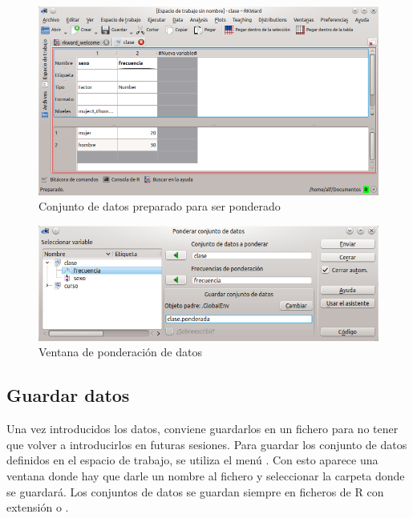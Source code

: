 \begin{figure}[htp]
\begin{center}
  \includegraphics[scale=0.6]{introduccion_r/img/datos_frecuencias}
  \caption{Conjunto de datos preparado para ser ponderado}
  \label{g:ponderar_variable1}
\end{center}
\end{figure}

\begin{figure}[htp]
\begin{center}
  \includegraphics[scale=0.6]{introduccion_r/img/ponderacion}
  \caption{Ventana de ponderación de datos}
  \label{g:ponderar_variable2}
\end{center}
\end{figure}


\subsection{Guardar datos}
Una vez introducidos los datos, conviene guardarlos en un fichero para no tener que volver a introducirlos en futuras
sesiones. Para guardar los conjunto de datos definidos en el espacio de trabajo, se utiliza el menú .
Con esto aparece una ventana donde hay que darle un nombre al fichero y seleccionar la carpeta donde se guardará.
Los conjuntos de datos se guardan siempre en ficheros de R con extensión  o .

